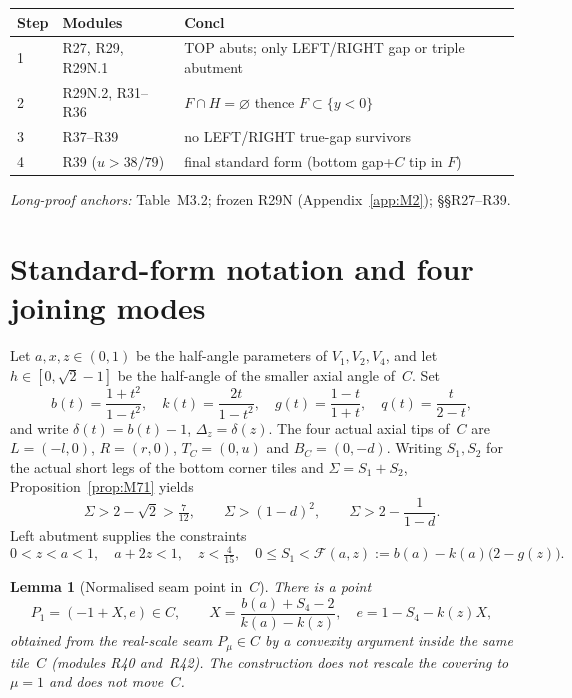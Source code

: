 \documentclass[11pt,reqno]{amsart}
\newtheorem{lemma}[theorem]{Lemma}
\theoremstyle{definition}
\begin{document}
\begin{center}
\small
\begin{tabular}{@{}llp{}@{}}
\toprule
Step & Modules & Concl \\
\midrule
1 & R27, R29, R29N.1 & TOP abuts; only LEFT/RIGHT gap or triple abutment \\
2 & R29N.2, R31--R36 & $F\cap H=\varnothing$ thence $F\subset\{y<0\}$ \\
3 & R37--R39 & no LEFT/RIGHT true-gap survivors \\
4 & R39 ($u>38/79$) & final standard form (bottom gap+$C$ tip in $F$) \\
\bottomrule
\end{tabular}
\end{center}
\smallskip
\noindent\textit{Long-proof anchors:} Table~M3.2; frozen R29N
(Appendix~\ref{app:M2}); §§R27--R39.

\section{Standard-form notation and four joining modes}\label{sec:std}

Let $a,x,z\in(0,1)$ be the half-angle parameters of $V_1,V_2,V_4$, and let
$h\in[0,\sqrt2-1]$ be the half-angle of the smaller axial angle of~$C$.  Set
\begin{equation}\label{eq:M8}
b(t)=\frac{1+t^2}{1-t^2},\quad
k(t)=\frac{2t}{1-t^2},\quad
g(t)=\frac{1-t}{1+t},\quad
q(t)=\frac{t}{2-t},
\end{equation}
and write $\delta(t)=b(t)-1$, $\Delta_z=\delta(z)$.  The four actual axial tips
of~$C$ are $L=(-l,0)$, $R=(r,0)$, $T_C=(0,u)$ and $B_C=(0,-d)$.  Writing
$S_1,S_2$ for the actual short legs of the bottom corner tiles and
$\Sigma=S_1+S_2$, Proposition~\ref{prop:M71} yields
\begin{equation}\label{eq:M9}
\Sigma>2-\sqrt2>\tfrac7{12},\qquad
\Sigma>(1-d)^2,\qquad
\Sigma>2-\frac1{1-d}.
\end{equation}
Left abutment supplies the constraints
\begin{equation}\label{eq:M10}
0<z<a<1,\quad a+2z<1,\quad z<\tfrac4{15},\quad
0\le S_1<\mathcal F(a,z):=b(a)-k(a)\bigl(2-g(z)\bigr).
\end{equation}

\begin{lemma}[Normalised seam point in~$C$]\label{lem:M81}
There is a point
\begin{equation}\label{eq:M11}
P_1=(-1+X,e)\in C,\qquad
X=\frac{b(a)+S_4-2}{k(a)-k(z)},\quad
e=1-S_4-k(z)X,
\end{equation}
obtained from the real-scale seam $P_\mu\in C$ by a convexity argument inside
the same tile~$C$ (modules R40 and~R42).  The construction does not rescale the
covering to $\mu=1$ and does not move~$C$.
\end{lemma}
\end{document}
